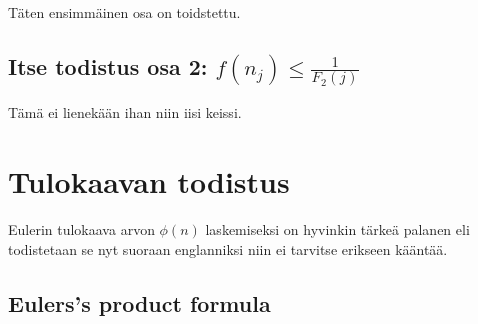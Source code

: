 \documentclass{article}
\theoremstyle{definition}
\begin{document}
Täten ensimmäinen osa on toidstettu.

\subsection{Itse todistus osa 2: $f(n_j) \leq \frac{1}{F_2(j)}$}

Tämä ei lienekään ihan niin iisi keissi.

\section{Tulokaavan todistus}

Eulerin tulokaava arvon $\phi(n)$ laskemiseksi on hyvinkin tärkeä palanen eli todistetaan se nyt suoraan englanniksi niin ei tarvitse erikseen kääntää.

\subsection{Eulers's product formula}
\end{document}
